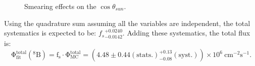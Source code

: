 \begin{figure}[htbp]
	\centering
	\caption[Smearing effects on the $\cos\theta_{sun}$.]{Smearing effects on the $\cos\theta_{sun}$.	\label{smearESpdfs}}
\end{figure}   

Using the quadrature sum assuming all the variables are independent, the total systematics is expected to be: ${f_s}^{+0.0240}_{-0.0142}$. Adding these systematics, the total flux is:
\begin{equation}
\mathrm{\Phi^{total}_{fit}({^8 B})=f_s\cdot \Phi^{total}_{MC}=(4.48\pm 0.44(stats.)^{+0.13}_{-0.08}(syst.))\times 10^6~cm^{-2}s^{-1}.}
\end{equation}

